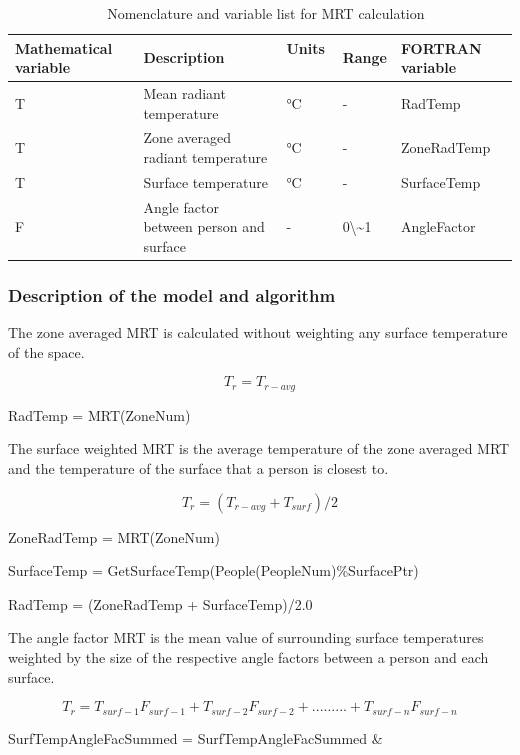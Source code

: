 \begin{longtable}[c]{p{1.2in}p{1.2in}p{1.2in}p{1.2in}p{1.2in}}
\caption{  Nomenclature and variable list for MRT calculation \protect \label{table:nomenclature-and-variable-list-for-mrt}}\\
\toprule 
Mathematical variable & Description & Units ~ & Range & FORTRAN variable \tabularnewline \midrule
\endhead
T & Mean radiant temperature & °C & - & RadTemp \tabularnewline
T & Zone averaged radiant temperature & °C & - & ZoneRadTemp \tabularnewline
T & Surface temperature & °C & - & SurfaceTemp \tabularnewline
F & Angle factor between person and surface & - & 0\textbackslash\~{}1 & AngleFactor \tabularnewline
\bottomrule
\end{longtable}

\subsubsection{Description of the model and algorithm}\label{description-of-the-model-and-algorithm-3}

The zone averaged MRT is calculated without weighting any surface temperature of the space.

\begin{equation}
{T_r} = {T_{r - avg}}
\end{equation}

RadTemp = MRT(ZoneNum)

The surface weighted MRT is the average temperature of the zone averaged MRT and the temperature of the surface that a person is closest to.

\begin{equation}
{T_r} = ({T_{r - avg}} + {T_{surf}})/2
\end{equation}

ZoneRadTemp = MRT(ZoneNum)

SurfaceTemp = GetSurfaceTemp(People(PeopleNum)\%SurfacePtr)

RadTemp = (ZoneRadTemp + SurfaceTemp)/2.0

The angle factor MRT is the mean value of surrounding surface temperatures weighted by the size of the respective angle factors between a person and each surface.

\begin{equation}
{T_r} = {T_{surf - 1}}{F_{surf - 1}} + {T_{surf - 2}}{F_{surf - 2}} + ......... + {T_{surf - n}}{F_{surf - n}}
\end{equation}

SurfTempAngleFacSummed = SurfTempAngleFacSummed \&

